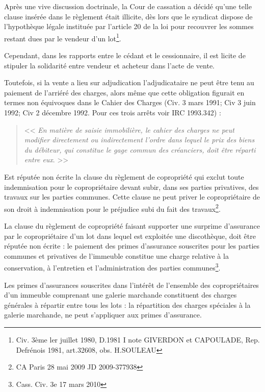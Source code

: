 			Après une vive discussion doctrinale, la Cour de cassation a décidé qu'une telle clause insérée dans le règlement était illicite, dès lors que le syndicat dispose de l'hypothèque légale instituée par l'article 20 de la loi pour recouvrer les sommes restant dues par le vendeur d'un lot\footnote{Civ. 3ème ler juillet 1980, D.1981 I note GIVERDON et CAPOULADE, Rep. Defrénois 1981, art.32608, obs. H.SOULEAU}.
			
			Cependant, dans les rapports entre le cédant et le cessionnaire, il est licite de stipuler la solidarité entre vendeur et acheteur dans l'acte de vente.
			
			Toutefois, si la vente a lieu sur adjudication l'adjudicataire ne peut être tenu au paiement de l'arriéré des charges, alors même que cette obligation figurait en termes non équivoques dans le Cahier des Charges (Civ. 3 mars 1991; Civ 3 juin 1992; Civ 2 décembre 1992. Pour ces trois arrêts voir IRC 1993.342) :
			\begin{quote}
				<< {\itshape En matière de saisie immobilière, le cahier des charges ne peut modifier directement ou indirectement l'ordre dans lequel le prix des biens du débiteur, qui constitue le gage commun des créanciers, doit être réparti entre eux}. >>
			\end{quote}
		
			Est réputée non écrite la clause du règlement de copropriété qui exclut toute indemnisation pour le copropriétaire devant subir, dans ses parties privatives, des travaux sur les parties communes. Cette clause ne peut priver le copropriétaire de son droit à indemnisation pour le préjudice subi du fait des travaux\footnote{CA Paris 28 mai 2009 JD 2009-377938}.
			
			La clause du règlement de copropriété faisant supporter une surprime d’assurance par le copropriétaire d’un lot dans lequel est exploitée une discothèque, doit être réputée non écrite : le paiement des primes d’assurance souscrites pour les parties communes et privatives de l’immeuble constitue une charge relative à la conservation, à l’entretien et l’administration des parties communes\footnote{Cass. Civ. 3e 17 mars 2010}.
			
			Les primes d’assurances souscrites dans l’intérêt de l’ensemble des copropriétaires d’un immeuble comprenant une galerie marchande constituent des charges générales à répartir entre tous les lots : la répartition des charges spéciales à la galerie marchande, ne peut s’appliquer aux primes d’assurance.
			
